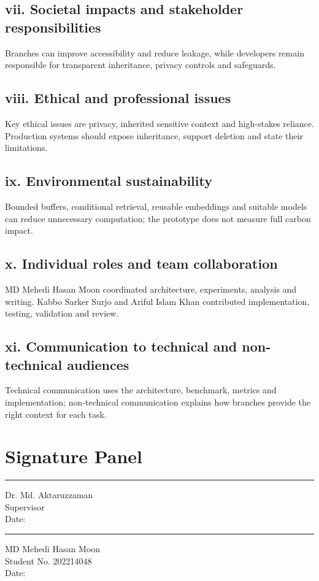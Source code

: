 \subsection*{vii. Societal impacts and stakeholder responsibilities}
Branches can improve accessibility and reduce leakage, while developers remain responsible for transparent inheritance, privacy controls and safeguards.

\subsection*{viii. Ethical and professional issues}
Key ethical issues are privacy, inherited sensitive context and high-stakes reliance. Production systems should expose inheritance, support deletion and state their limitations.

\subsection*{ix. Environmental sustainability}
Bounded buffers, conditional retrieval, reusable embeddings and suitable models can reduce unnecessary computation; the prototype does not measure full carbon impact.

\subsection*{x. Individual roles and team collaboration}
MD Mehedi Hasan Moon coordinated architecture, experiments, analysis and writing. Kabbo Sarker Surjo and Ariful Islam Khan contributed implementation, testing, validation and review.

\subsection*{xi. Communication to technical and non-technical audiences}
Technical communication uses the architecture, benchmark, metrics and implementation; non-technical communication explains how branches provide the right context for each task.

\section{Signature Panel}
\vspace{12mm}

\noindent
\begin{minipage}[t]{0.45\textwidth}
\hrule\medskip
Dr. Md. Aktaruzzaman\\
Supervisor\\
Date:
\end{minipage}
\hfill
\begin{minipage}[t]{0.45\textwidth}
\hrule\medskip
MD Mehedi Hasan Moon\\
Student No. 202214048\\
Date:
\end{minipage}

